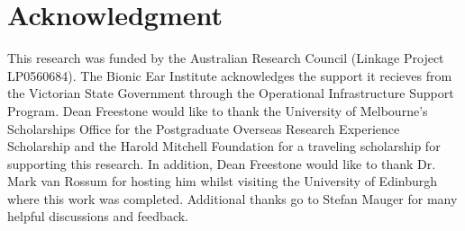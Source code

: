 \documentclass[a4paper]{IEEEtran}
\begin{document}
\section*{Acknowledgment}
This research was funded by the Australian Research Council (Linkage Project LP0560684). The Bionic Ear Institute acknowledges the support it recieves from the Victorian State Government through the Operational Infrastructure Support Program. Dean Freestone would like to thank the University of Melbourne's Scholarships Office for the Postgraduate Overseas Research Experience Scholarship and the Harold Mitchell Foundation for a traveling scholarship for supporting this research. In addition, Dean Freestone would like to thank Dr. Mark van Rossum for hosting him whilst visiting the University of Edinburgh where this work was completed. Additional thanks go to Stefan Mauger for many helpful discussions and feedback.









%

% 
% 
% 
% 
% 
% 

\end{document}
